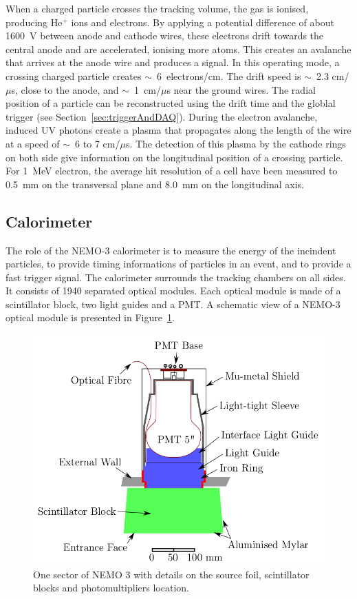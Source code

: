\documentclass[main.tex]{subfiles}
\begin{document}
\NI When a charged particle crosses the tracking volume, the gas is ionised, producing He$^{+}$ ions and electrons. By applying a potential difference of about 1600~V between anode and cathode wires, these electrons drift towards the central anode and are accelerated, ionising more atoms. This creates an avalanche that arrives at the anode wire and produces a signal. In this operating mode, a crossing charged particle creates $\sim$~6~electrons/cm. The drift speed is $\sim$~2.3 cm/$\mu$s, close to the anode, and $\sim$~1~cm/$\mu$s near the ground wires. The radial position of a particle can be reconstructed using the drift time and the globlal trigger (see Section~\ref{sec:triggerAndDAQ}). During the electron avalanche, induced UV photons create a plasma that propagates along the length of the wire at a speed of $\sim$~6 to 7 cm/$\mu$s. The detection of this plasma by the cathode rings on both side give information on the longitudinal position of a crossing particle. For 1~MeV electron, the average hit resolution of a cell have been measured to 0.5~mm on the transversal plane and 8.0~mm on the longitudinal axis.


\subsection{Calorimeter}


\NI The role of the NEMO-3 calorimeter is to measure the energy of the incindent particles, to provide timing informations of particles in an event, and to provide a fast trigger signal. The calorimeter surrounds the tracking chambers on all sides. It consists of 1940 separated optical modules. Each optical module is made of a scintillator block, two light guides and a PMT. A schematic view of a NEMO-3 optical module is presented in Figure~\ref{CaloModuleNEMO3}.	


\bigskip

\begin{figure}[h!]
\begin{center}
\includegraphics[scale=0.40]{pictures/Chap3/CaloModuleNEMO3.png}
\caption{One sector of NEMO 3 with details on the source foil, scintillator blocks and photomultipliers location.}
\label{CaloModuleNEMO3}
\end{center}
\end{figure}
\end{document}
